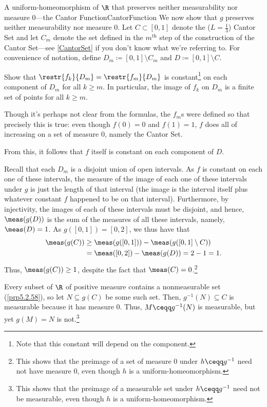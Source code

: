 \begin{exm}{A uniform-homeomorphism of $\R$ that preserves neither measurability nor measure $0$---the Cantor Function}{CantorFunction}
We now show that $g$ preserves neither measurability nor measure $0$.  Let $C\subset [0,1]$ denote the ($L=\tfrac{1}{3}$) Cantor Set and let $C_m$ denote the set defined in the $m^{\text{th}}$ step of the construction of the Cantor Set---see \cref{CantorSet} if you don't know what we're referring to.  For convenience of notation, define $D_m\coloneqq [0,1]\setminus C_m$ and $D\coloneqq [0,1]\setminus C$.
\begin{exr}[breakable=false]{}{}
Show that $\restr{f_k}{D_m}=\restr{f_m}{D_m}$ is constant\footnote{Note that this constant will depend on the component.} on each component of $D_m$ for all $k\geq m$.  In particular, the image of $f_k$ on $D_m$ is a finite set of points for all $k\geq m$.
\begin{rmk}
Though it's perhaps not clear from the formulas, the $f_m$s were defined so that precisely this is true:  even though $f(0)=0$ and $f(1)=1$, $f$ does all of increasing on a set of measure $0$, namely the Cantor Set.
\end{rmk}
\end{exr}
From this, it follows that $f$ itself is constant on each component of $D$.

Recall that each $D_m$ is a disjoint union of open intervals.  As $f$ is constant on each one of these intervals, the measure of the image of each one of these intervals under $g$ is just the length of that interval (the image is the interval itself plus whatever constant $f$ happened to be on that interval).  Furthermore, by injectivity, the images of each of these intervals must be disjoint, and hence, $\meas (g(D))$ is the sum of the measures of all these intervals, namely, $\meas (D)=1$.  As $g([0,1])=[0,2]$, we thus have that
\begin{equation}
\begin{split}
\meas (g(C)) & \geq \meas (g([0,1]))-\meas (g([0,1]\setminus C)) \\
& =\meas ([0,2])-\meas (g(D))=2-1=1.
\end{split}
\end{equation}
Thus, $\meas (g(C))\geq 1$, despite the fact that $\meas (C)=0$.\footnote{This shows that the preimage of a set of measure $0$ under $h\ceqq g^{-1}$ need not have measure $0$, even though $h$ is a uniform-homeomorphism.}

Every subset of $\R$ of positive measure contains a nonmeasurable set (\cref{prp5.2.58}), so let $N\subseteq g(C)$ be some such set.  Then, $g^{-1}(N)\subseteq C$ is measurable because it has measure $0$.  Thus, $M\ceqq g^{-1}(N)$ is measurable, but yet $g(M)=N$ is not.\footnote{This shows that the preimage of a measurable set under $h\ceqq g^{-1}$ need not be measurable, even though $h$ is a uniform-homeomorphism.}
\end{exm}

